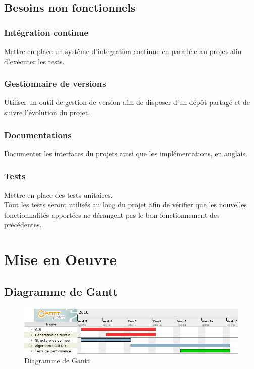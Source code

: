 \documentclass[12pt]{report}
\begin{document}

\section{Besoins non fonctionnels}

\subsection{Intégration continue}

Mettre en place un système d'intégration continue en parallèle au projet
afin d'exécuter les tests.\\

\subsection{Gestionnaire de versions}

Utiliser un outil de gestion de version afin de disposer d'un dépôt
partagé et de suivre l'évolution du projet.\\

\subsection{Documentations}

Documenter les interfaces du projets ainsi que les implémentations, en
anglais.\\

\subsection{Tests}

Mettre en place des tests unitaires.\\
Tout les tests seront utilisés au long du projet afin de vérifier que
les nouvelles fonctionnalités apportées ne dérangent pas le bon
fonctionnement des précédentes.

\newpage

\chapter*{Mise en Oeuvre}
\setcounter{chapter}{4}




\section{Diagramme de Gantt}

\begin{figure}[!h]
  \includegraphics[scale=0.5]{img/gantt.png}
  \caption{Diagramme de Gantt}
  \label{fig:gantt}
\end{figure}

{}

\end{document}
